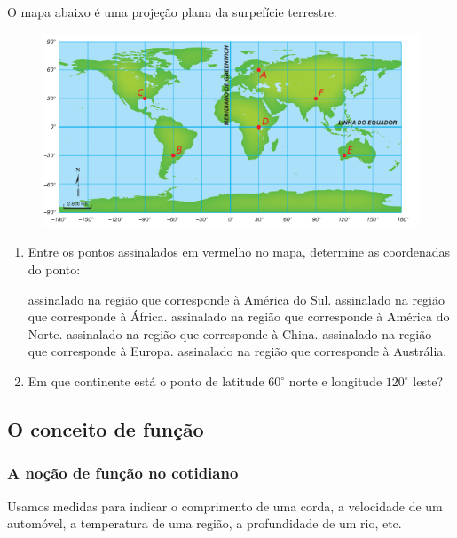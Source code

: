 \begin{enumerate}[label*=\protect\fbox{\arabic{enumi}}]
    O mapa abaixo é uma projeção plana da surpefície terrestre.

    \begin{figure}[H]
      \centering
      \includegraphics[width=1\linewidth]{figures/2.png}
    \end{figure}

    \begin{enumerate}[I]
      \item Entre os pontos assinalados em vermelho no mapa, determine as coordenadas do ponto:
        \begin{tasks}
          \task assinalado na região que corresponde à América do Sul.
          \task assinalado na região que corresponde à África.
          \task assinalado na região que corresponde à América do Norte.
          \task assinalado na região que corresponde à China.
          \task assinalado na região que corresponde à Europa.
          \task assinalado na região que corresponde à Austrália.
        \end{tasks}
      \item Em que continente está o ponto de latitude $60^\circ$ norte e longitude $120^\circ$ leste?
    \end{enumerate}
\end{enumerate}

\subsection{O conceito de função}

\subsubsection{A noção de função no cotidiano}

Usamos medidas para indicar o comprimento de uma corda, a velocidade de um automóvel, a temperatura 
de uma região, a profundidade de um rio, etc.

